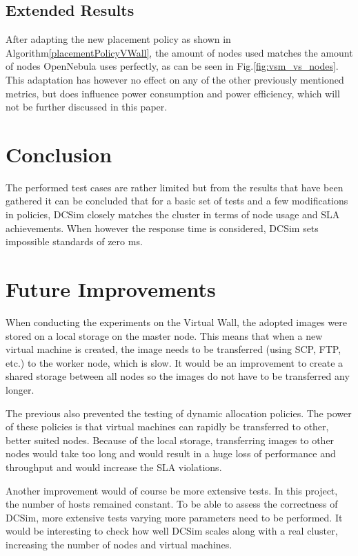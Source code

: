 \documentclass[conference, 10pt]{IEEEtran}
\begin{document}
\subsection{Extended Results}
After adapting the new placement policy as shown in Algorithm\xspace\ref{placementPolicyVWall}, the amount of nodes used matches the amount of nodes OpenNebula uses perfectly, as can be seen in Fig.\xspace\ref{fig:vsm_vs_nodes}. This adaptation has however no effect on any of the other previously mentioned metrics, but does influence power consumption and power efficiency, which will not be further discussed in this paper.

\section{Conclusion}
\label{sec:conclusion}
The performed test cases are rather limited but from the results that have been gathered it can be concluded that for a basic set of tests and a few modifications in policies, DCSim closely matches the cluster in terms of node usage and SLA achievements.
When however the response time is considered, DCSim sets impossible standards of zero ms.

\section{Future Improvements}
\label{sec:futureimprovements}
When conducting the experiments on the Virtual Wall, the adopted images were stored on a local storage on the master node. This means that when a new virtual machine is created, the image needs to be transferred (using SCP, FTP, etc.) to the worker node, which is slow. It would be an improvement to create a shared storage between all nodes so the images do not have to be transferred any longer.

The previous also prevented the testing of dynamic allocation policies. The power of these policies is that virtual machines can rapidly be transferred to other,  better suited nodes. Because of the local storage, transferring images to other nodes would take too long and would result in a huge loss of performance and throughput and would increase the SLA violations.

Another improvement would of course be more extensive tests. In this project, the number of hosts remained constant. To be able to assess the correctness of DCSim, more extensive tests varying more parameters need to be performed. It would be interesting to check how well DCSim scales along with a real cluster, increasing the number of nodes and virtual machines.


\end{document}
